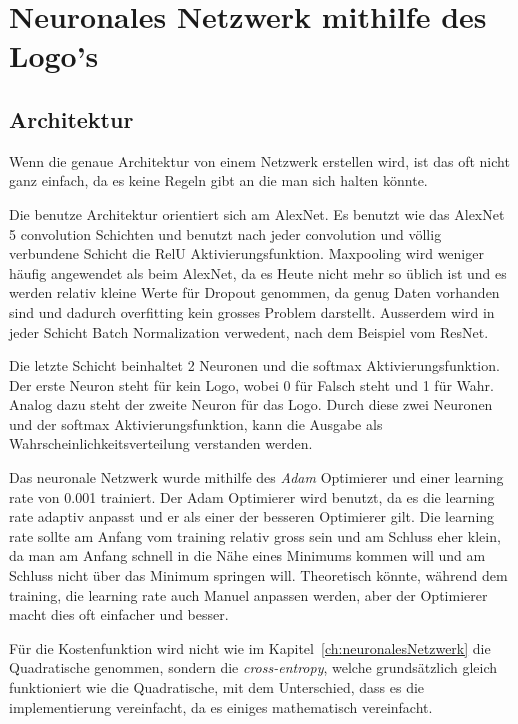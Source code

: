 \documentclass[12pt,a4paper]{report}
\begin{document}
\section{Neuronales Netzwerk mithilfe des Logo's}
\subsection{Architektur}
Wenn die genaue Architektur von einem Netzwerk erstellen wird, ist das oft nicht ganz einfach,
da es keine Regeln gibt an die man sich halten könnte.

Die benutze Architektur orientiert sich am AlexNet\cite{alex}.
Es benutzt wie das AlexNet 5 convolution Schichten und benutzt nach jeder convolution und völlig verbundene
Schicht die RelU Aktivierungsfunktion.
Maxpooling wird weniger häufig angewendet als beim AlexNet, da es Heute nicht mehr so üblich ist\cite{conv} und
es werden relativ kleine Werte für Dropout genommen, da genug Daten vorhanden sind und dadurch overfitting kein grosses Problem darstellt.
Ausserdem wird in jeder Schicht Batch Normalization verwedent, nach dem Beispiel vom ResNet.\cite{conv}

Die letzte Schicht beinhaltet 2 Neuronen und die softmax Aktivierungsfunktion.
Der erste Neuron steht für kein Logo, wobei 0 für Falsch steht und 1 für Wahr.
Analog dazu steht der zweite Neuron für das Logo.
Durch diese zwei Neuronen und der softmax Aktivierungsfunktion, kann die Ausgabe als Wahrscheinlichkeitsverteilung verstanden werden.

Das neuronale Netzwerk wurde mithilfe des \textit{Adam} Optimierer\cite{adam} und einer learning rate von 0.001 trainiert.
Der Adam Optimierer wird benutzt, da es die learning rate adaptiv anpasst und er als einer der besseren Optimierer gilt\cite{adam}.
Die learning rate sollte am Anfang vom training relativ gross sein und am Schluss eher klein, da man am Anfang schnell in die Nähe eines Minimums kommen will
und am Schluss nicht über das Minimum springen will.
Theoretisch könnte, während dem training, die learning rate auch Manuel anpassen werden, aber der Optimierer macht dies oft einfacher und besser.

Für die Kostenfunktion wird nicht wie im Kapitel~\ref{ch:neuronalesNetzwerk} die Quadratische genommen,
sondern die \textit{cross-entropy}\cite{softmax}, welche grundsätzlich gleich funktioniert wie die Quadratische, mit dem Unterschied,
dass es die implementierung vereinfacht, da es einiges mathematisch vereinfacht\cite{softmax}.
\end{document}

